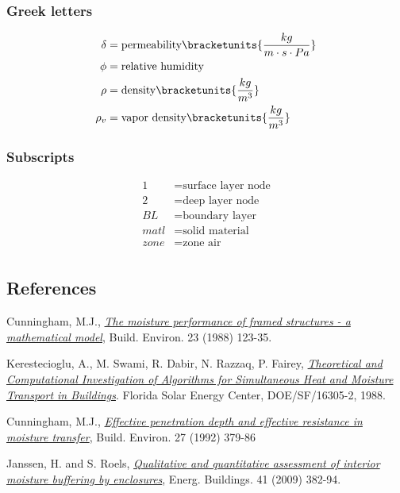 {\subsubsection{Greek letters}\label{greek-letters}
\begin{align*}  
  \delta  &= \text{permeability} \bracketunits{\frac{kg}{m \cdot s \cdot Pa}} \\
  \phi &= \text{relative humidity} \\
  \rho &= \text{density} \bracketunits{\frac{kg}{m^{3}}} \\
  \rho_{v} &= \text{vapor density} \bracketunits{\frac{kg}{m^{3}}} \\
\end{align*}

\subsubsection{Subscripts}\label{subscripts-and-superscripts}
\begin{align*}
	1 &= \text{surface layer node} \\
	2 &= \text{deep layer node} \\
	BL &= \text{boundary layer} \\
	matl &= \text{solid material} \\
	zone &= \text{zone air} \\
\end{align*}

\subsection{References}\label{references-019}

Cunningham, M.J.,
\href{http://www.sciencedirect.com/science/article/pii/0360132388900261}{\emph{The
		moisture performance of framed structures - a mathematical model}},
Build. Environ. 23 (1988) 123-35.

Kerestecioglu, A., M. Swami, R. Dabir, N. Razzaq, P. Fairey,
\href{http://www.fsec.ucf.edu/en/publications/pdf/FSEC-CR-191-88.pdf}{\emph{Theoretical
		and Computational Investigation of Algorithms for Simultaneous Heat and
		Moisture Transport in Buildings}}. Florida Solar Energy Center,
DOE/SF/16305-2, 1988.

Cunningham, M.J.,
\href{http://www.sciencedirect.com/science/article/pii/036013239290037P}{\emph{Effective
		penetration depth and effective resistance in moisture transfer}},
Build. Environ. 27 (1992) 379-86

Janssen, H. and S. Roels,
\href{http://www.sciencedirect.com/science/article/pii/S0378778808002387}{\emph{Qualitative
		and quantitative assessment of interior moisture buffering by
		enclosures}}, Energ. Buildings. 41 (2009) 382-94.

}
